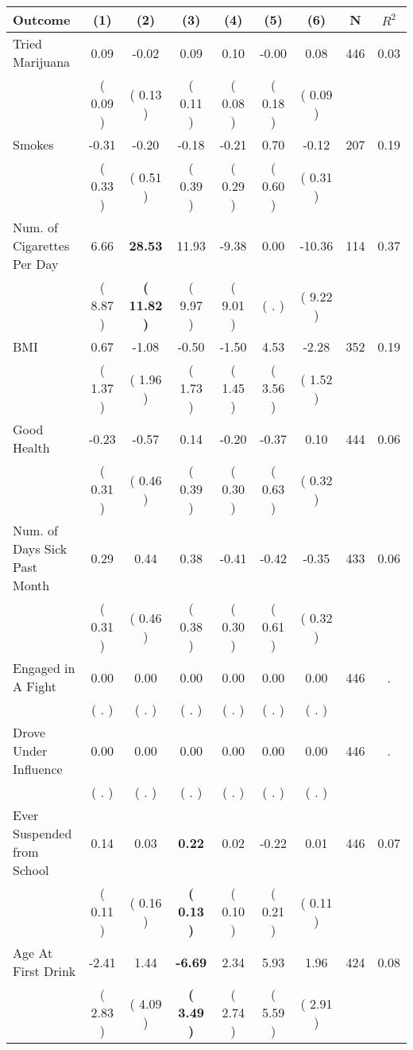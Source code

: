 \begin{tabular}{lcccccccc}
\toprule
 \textbf{Outcome} & \textbf{(1)} & \textbf{(2)} & \textbf{(3)} & \textbf{(4)} & \textbf{(5)} & \textbf{(6)} & \textbf{N} & \textbf{$ R^2$} \\
\midrule
Tried Marijuana &      0.09 &     -0.02 &      0.09 &      0.10 &     -0.00 &      0.08 & 446 &       0.03 \\ 
 & (     0.09 ) & (     0.13 ) & (     0.11 ) & (     0.08 ) & (     0.18 ) & (     0.09 ) & \\
Smokes &     -0.31 &     -0.20 &     -0.18 &     -0.21 &      0.70 &     -0.12 & 207 &       0.19 \\ 
 & (     0.33 ) & (     0.51 ) & (     0.39 ) & (     0.29 ) & (     0.60 ) & (     0.31 ) & \\
Num. of Cigarettes Per Day &      6.66 & \textbf{    28.53} &     11.93 &     -9.38 &      0.00 &    -10.36 & 114 &       0.37 \\ 
 & (     8.87 ) & \textbf{(    11.82 )} & (     9.97 ) & (     9.01 ) & (        . ) & (     9.22 ) & \\
BMI &      0.67 &     -1.08 &     -0.50 &     -1.50 &      4.53 &     -2.28 & 352 &       0.19 \\ 
 & (     1.37 ) & (     1.96 ) & (     1.73 ) & (     1.45 ) & (     3.56 ) & (     1.52 ) & \\
Good Health &     -0.23 &     -0.57 &      0.14 &     -0.20 &     -0.37 &      0.10 & 444 &       0.06 \\ 
 & (     0.31 ) & (     0.46 ) & (     0.39 ) & (     0.30 ) & (     0.63 ) & (     0.32 ) & \\
Num. of Days Sick Past Month &      0.29 &      0.44 &      0.38 &     -0.41 &     -0.42 &     -0.35 & 433 &       0.06 \\ 
 & (     0.31 ) & (     0.46 ) & (     0.38 ) & (     0.30 ) & (     0.61 ) & (     0.32 ) & \\
Engaged in A Fight &      0.00 &      0.00 &      0.00 &      0.00 &      0.00 &      0.00 & 446 &          . \\ 
 & (        . ) & (        . ) & (        . ) & (        . ) & (        . ) & (        . ) & \\
Drove Under Influence &      0.00 &      0.00 &      0.00 &      0.00 &      0.00 &      0.00 & 446 &          . \\ 
 & (        . ) & (        . ) & (        . ) & (        . ) & (        . ) & (        . ) & \\
Ever Suspended from School &      0.14 &      0.03 & \textbf{     0.22} &      0.02 &     -0.22 &      0.01 & 446 &       0.07 \\ 
 & (     0.11 ) & (     0.16 ) & \textbf{(     0.13 )} & (     0.10 ) & (     0.21 ) & (     0.11 ) & \\
Age At First Drink &     -2.41 &      1.44 & \textbf{    -6.69} &      2.34 &      5.93 &      1.96 & 424 &       0.08 \\ 
 & (     2.83 ) & (     4.09 ) & \textbf{(     3.49 )} & (     2.74 ) & (     5.59 ) & (     2.91 ) & \\
\bottomrule
\end{tabular}
